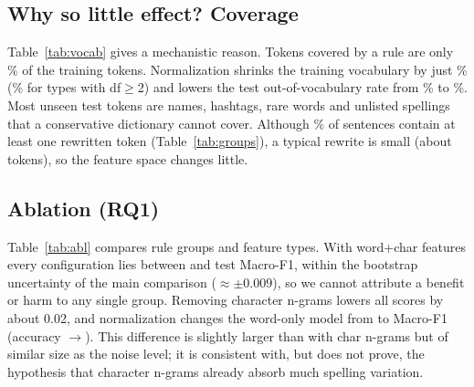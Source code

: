 \documentclass[10pt,twocolumn,letterpaper]{article}
\begin{document}
\subsection{Why so little effect? Coverage}
\begin{table}[t]\centering\footnotesize\setlength{\tabcolsep}{4pt}

\caption{Vocabulary effect of normalization (train split, test OOV).}\label{tab:vocab}
\end{table}
\begin{table}[t]\centering\footnotesize\setlength{\tabcolsep}{3pt}

\caption{Rule groups: number of variant forms and number of sentences (all splits) changed by each group alone.}\label{tab:groups}
\end{table}
Table~\ref{tab:vocab} gives a mechanistic reason. Tokens covered by a rule are only \VocabVarShare\% of the training tokens. Normalization shrinks the training vocabulary by just \TypesRed\% (\TypesRedTwo\% for types with df$\ge$2) and lowers the test out-of-vocabulary rate from \OOVRaw\% to \OOVNorm\%. Most unseen test tokens are names, hashtags, rare words and unlisted spellings that a conservative dictionary cannot cover. Although \ChangedPct\% of sentences contain at least one rewritten token (Table~\ref{tab:groups}), a typical rewrite is small (about \TokPerChanged{} tokens), so the feature space changes little.

\subsection{Ablation (RQ1)}
\begin{table}[t]\centering\footnotesize\setlength{\tabcolsep}{4pt}

\caption{Ablation. ``only $g$'': a single rule group; ``$-g$'': all groups except $g$. $C$ tuned on dev per row.}\label{tab:abl}
\end{table}
Table~\ref{tab:abl} compares rule groups and feature types. With word+char features every configuration lies between \AblMinF{} and \AblMaxF{} test Macro-F1, within the bootstrap uncertainty of the main comparison ($\approx\pm0.009$), so we cannot attribute a benefit or harm to any single group. Removing character n-grams lowers all scores by about 0.02, and normalization changes the word-only model from \WordRawF{} to \WordNormF{} Macro-F1 (accuracy \WordRawAcc{}$\to$\WordNormAcc). This difference is slightly larger than with char n-grams but of similar size as the noise level; it is consistent with, but does not prove, the hypothesis that character n-grams already absorb much spelling variation.
\end{document}
